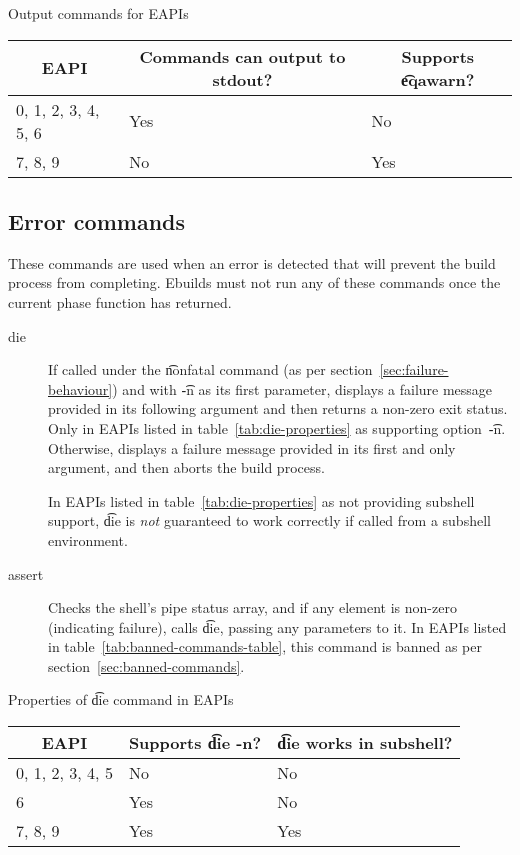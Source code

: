 \begin{centertable}{Output commands for EAPIs}
    \label{tab:output-commands}
    \begin{tabular}{lll}
      \toprule
      \multicolumn{1}{c}{\textbf{EAPI}} &
      \multicolumn{1}{c}{\textbf{Commands can output to stdout?}} &
      \multicolumn{1}{c}{\textbf{Supports \t{eqawarn}?}} \\
      \midrule
      0, 1, 2, 3, 4, 5, 6 & Yes & No  \\
      7, 8, 9             & No  & Yes \\
      \bottomrule
    \end{tabular}
\end{centertable}

\subsection{Error commands}
These commands are used when an error is detected that will prevent the build process from
completing. Ebuilds must not run any of these commands once the current phase function has returned.
\begin{description}
\item[die]  If called under the \t{nonfatal} command (as per
    section~\ref{sec:failure-behaviour}) and with \t{-n} as its first parameter, displays a failure
    message provided in its following argument and then returns a non-zero exit status. Only in
    EAPIs listed in table~\ref{tab:die-properties} as supporting option~\t{-n}. Otherwise, displays
    a failure message provided in its first and only argument, and then aborts the build process.

     In EAPIs listed in table~\ref{tab:die-properties} as not providing
    subshell support, \t{die} is \emph{not} guaranteed to work correctly if called from a subshell
    environment.
\item[assert] Checks the shell's pipe status array, and if any element is non-zero (indicating
    failure), calls \t{die}, passing any parameters to it.
    In EAPIs listed in table~\ref{tab:banned-commands-table}, this command is banned as per
    section~\ref{sec:banned-commands}.
\end{description}

\begin{centertable}{Properties of \t{die} command in EAPIs}
    \label{tab:die-properties}
    \begin{tabular}{lll}
      \toprule
      \multicolumn{1}{c}{\textbf{EAPI}} &
      \multicolumn{1}{c}{\textbf{Supports \t{die -n}?}} &
      \multicolumn{1}{c}{\textbf{\t{die} works in subshell?}} \\
      \midrule
      0, 1, 2, 3, 4, 5  & No  & No  \\
      6                 & Yes & No  \\
      7, 8, 9           & Yes & Yes \\
      \bottomrule
    \end{tabular}
\end{centertable}

